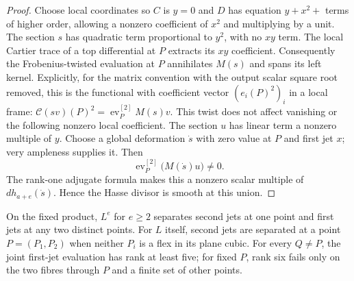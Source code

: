 \begin{proof}
Choose local coordinates so $C$ is $y=0$ and $D$ has equation
$y+x^2+$ terms of higher order, allowing a nonzero coefficient
of $x^2$ and multiplying by a unit. The section $s$ has quadratic
term proportional to $y^2$, with no $xy$ term. The local Cartier
trace of a top differential at $P$ extracts its $xy$ coefficient.
Consequently the Frobenius-twisted evaluation at $P$ annihilates
$M(s)$ and spans its left kernel. Explicitly, for the matrix
convention with the output scalar square root removed, this is
the functional with coefficient vector $(e_i(P)^2)_i$ in a
local frame: $\mathcal C(sv)(P)^2=\operatorname{ev}^{[2]}_P M(s)v$.
This twist does not affect vanishing or the following nonzero
local coefficient. The section $u$ has linear term a nonzero multiple
of $y$. Choose a global deformation $\dot s$ with zero value at
$P$ and first jet $x$; very ampleness supplies it.
Then
\[
       \operatorname{ev}^{[2]}_P\bigl(M(\dot s)u\bigr)\ne0.
\]
The rank-one adjugate formula makes this a nonzero scalar
multiple of $dh_{a+e}(\dot s)$. Hence the Hasse divisor is
smooth at this union.
\end{proof}

\begin{lemma}
\label{lem:product-small-degree-jets}
On the fixed product, $L^e$ for $e\ge2$ separates second jets at
one point and first jets at any two distinct points.
For $L$ itself, second jets are separated at a point
$P=(P_1,P_2)$ when neither $P_i$ is a flex in its plane cubic.
For every $Q\ne P$, the joint first-jet evaluation has rank at
least five; for fixed $P$, rank six fails only on the two fibres
through $P$ and a finite set of other points.
\end{lemma}


